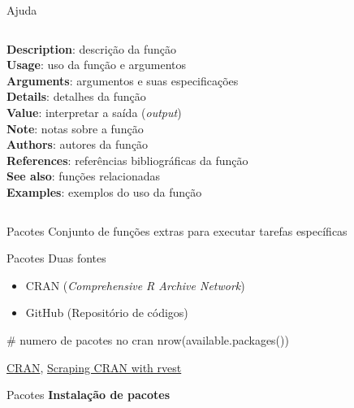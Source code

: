 \documentclass[
  ignorenonframetext,
]{beamer}
\newenvironment{Shaded}{\begin{snugshade}}{\end{snugshade}}
\newcommand{\CommentTok}[1]{\textcolor[rgb]{0.37,0.37,0.37}{#1}}
\newcommand{\FunctionTok}[1]{\textcolor[rgb]{0.28,0.35,0.67}{#1}}
\newcommand{\NormalTok}[1]{\textcolor[rgb]{0.00,0.23,0.31}{#1}}
\providecommand{\tightlist}{%
  \setlength{\itemsep}{0pt}\setlength{\parskip}{0pt}}\usepackage{longtable,booktabs,array}
\begin{document}
\begin{frame}[fragile]
\begin{block}{Ajuda}
\begin{columns}[T]
\begin{column}{0.5\textwidth}
\textbf{Description}: descrição da função\\
\textbf{Usage}: uso da função e argumentos\\
\textbf{Arguments}: argumentos e suas especificações\\
\textbf{Details}: detalhes da função\\
\textbf{Value}: interpretar a saída (\emph{output})\\
\textbf{Note}: notas sobre a função\\
\textbf{Authors}: autores da função\\
\textbf{References}: referências bibliográficas da função\\
\textbf{See also}: funções relacionadas\\
\textbf{Examples}: exemplos do uso da função
\end{column}
\end{columns}
\end{block}

\begin{block}{Pacotes}
\protect\hypertarget{pacotes}{}
Conjunto de funções extras para executar tarefas específicas
\end{block}

\begin{block}{Pacotes}
\protect\hypertarget{pacotes-1}{}
Duas fontes

\begin{itemize}
\tightlist
\item
  CRAN (\emph{Comprehensive R Archive Network})
\item
  GitHub (Repositório de códigos)
\end{itemize}

\begin{Shaded}
\begin{Highlighting}[]
\CommentTok{\# numero de pacotes no cran}
\FunctionTok{nrow}\NormalTok{(}\FunctionTok{available.packages}\NormalTok{())}
\end{Highlighting}
\end{Shaded}

\href{https://cran.r-project.org/}{CRAN},
\href{https://www.r-bloggers.com/2017/03/scraping-cran-with-rvest/}{Scraping
CRAN with rvest}
\end{block}

\begin{block}{Pacotes}
\protect\hypertarget{pacotes-2}{}
\textbf{Instalação de pacotes}


\end{block}
\end{frame}
\end{document}

